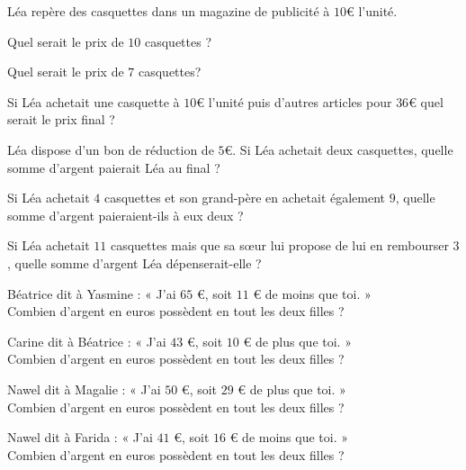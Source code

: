 \documentclass[11pt]{article}
\begin{document}
\begin{multicols}{2}
\begin{exercice}[3]
\begin{enumerate}
  \end{enumerate}
\end{exercice}
\begin{exercice}[4]
  Léa repère des casquettes dans un magazine de publicité à $10$€
  l'unité.
  \begin{enu}
  \item Quel serait le prix de $10$ casquettes ?
  \item Quel serait le prix de $7$ casquettes?
  \item Si Léa achetait une casquette à $10$€ l'unité puis d'autres
    articles pour $36$€ quel serait le prix final ?
  \item Léa dispose d'un bon de réduction de $5$€. Si Léa achetait
    deux casquettes, quelle somme d'argent paierait Léa au final ?
  \item Si Léa achetait $4$ casquettes et son grand-père en achetait
    également $9$, quelle somme d'argent paieraient-ils à eux deux ?
  \item Si Léa achetait $11$ casquettes mais que sa sœur lui propose
    de lui en rembourser $3$, quelle somme d'argent Léa
    dépenserait-elle ?
  \end{enu}
\end{exercice}
\begin{exercice}[4]
    \begin{enu}
    \item Béatrice dit à Yasmine : « J'ai $65$ €, soit $11$ € de moins que toi. » \\
      Combien d'argent en euros possèdent en tout les deux filles ?
    \item Carine dit à Béatrice  : « J'ai $43$ €, soit $10$ € de plus que toi.  » \\
      Combien d'argent en euros possèdent en tout les deux filles ?
    \item Nawel dit à Magalie  : « J'ai $50$ €, soit $29$ € de plus que toi.  » \\
      Combien d'argent en euros possèdent en tout les deux filles ?
    \item Nawel dit à Farida : « J'ai $41$ €, soit $16$ € de moins que toi. » \\
     Combien d'argent en euros possèdent en tout les deux filles ?
    \end{enu}
  \end{exercice}
\end{multicols}
\end{document}
